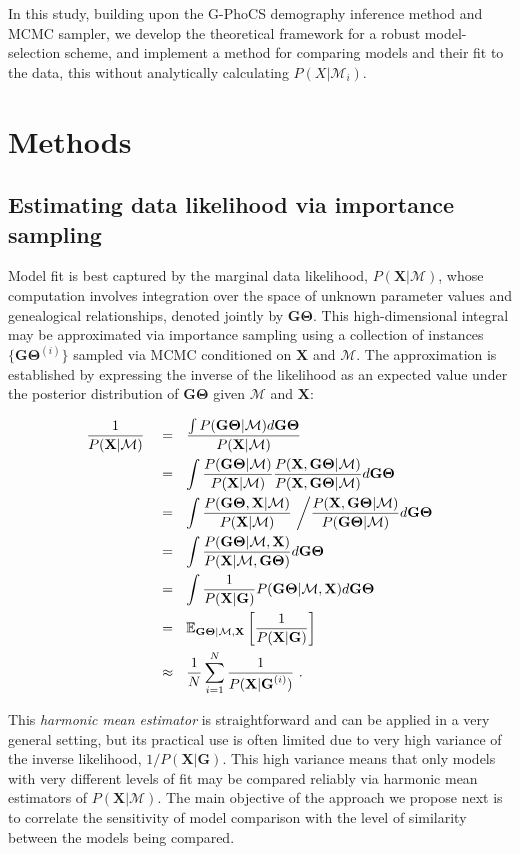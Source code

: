 \documentclass[11pt]{article}
\newcommand{\vect}[1]{\boldsymbol{\mathbf{#1}}}
\newcommand{\E}{\mathbb{E}}
\newcommand{\X}{\vect{X}}
\newcommand{\M}{\mathcal{M}}
\newcommand{\G}{\vect{G}}
\newcommand{\T}{\vect{\Theta}}
\newcommand{\GT}{\G\T}
\newcommand{\1}{\mathbbm{1}}
\newcommand{\gp}{G-PhoCS }
\begin{document}
%
In this study, building upon the \gp demography inference method and MCMC sampler, we develop the theoretical framework for a robust model-selection scheme, and implement a method for comparing models and their fit to the data, this without analytically calculating $P(X|\M_i)$.

\section{Methods}


\subsection{Estimating data likelihood via importance sampling}

Model fit is best captured by the marginal data likelihood, $P(\X|\M)$, whose computation involves integration over the space of unknown parameter values and genealogical relationships,
denoted jointly by $\GT$.
%
This high-dimensional integral may be approximated via importance sampling using a collection of instances $\{\GT^{(i)}\}$ sampled via MCMC conditioned on $\X$ and $\M$.
%
The approximation is established by expressing the inverse of the likelihood as an expected value under the posterior distribution of $\GT$ given $\M$ and $\X$:
%
%
\begin{small}
\begin{align}
\frac{1}{P(\X|\M)} ~~~
&=~~ \frac{\int P(\GT|\M)d\GT}{P(\X|\M)} \notag \\ %
&=~~ \int \frac{P(\GT|\M)}{P(\X|\M)} \frac{P(\X,\GT|\M)}{P(\X,\GT|\M)}  d\GT \notag \\ %
&=~~ \int \frac{P(\GT,\X |\M)}{P(\X|\M)} ~\bigg/ \frac{P(\X,\GT|\M)}{P(\GT|\M)}  d\GT \notag \\ %
&=~~ \int \frac{P(\GT|\M,\X)}{P(\X|\M,\GT)} d\GT \notag \\ %
&=~~ \int \frac{1}{P(\X|\G)}P(\GT|\M,\X) d\GT  \notag \\ %
&=~~ \E_{\GT|\M,\X } \left[\frac{1}{P(\X|\G)}\right] \notag\\  %
&\approx~~ \frac{1}{N} \sum_{i=1}^{N}\frac{1}{P(\X|\G^{(i)})} ~. \label{eq:harmonic}
\end{align}
\end{small}

This {\em harmonic mean estimator} is straightforward and can be applied in a very general setting, but its practical use is often limited due to very high variance
of the inverse likelihood, $1/P(\X|\G)$.
%
This high variance means that only models with very different levels of fit may be compared reliably via harmonic mean estimators of $P(\X|\M)$.
%
The main objective of the approach we propose next is to correlate the sensitivity of model comparison with the level of similarity between the models being compared.
%
\end{document}
